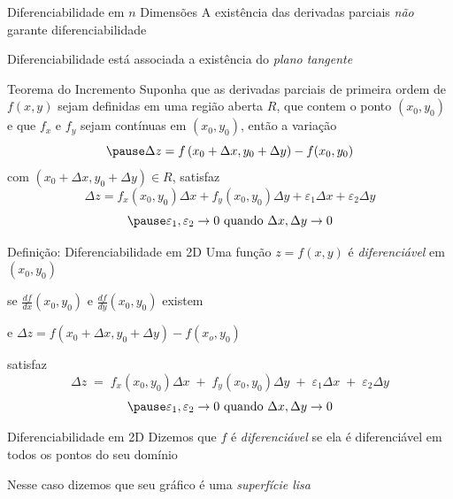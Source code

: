 \begin{frame}{Diferenciabilidade em $n$ Dimensões}
	A existência das derivadas parciais \emph{não} garante diferenciabilidade

	\pause
	\vspace{\baselineskip}
	Diferenciabilidade está associada a existência do \emph{plano tangente}
\end{frame}

\begin{frame}{Teorema do Incremento}
	Suponha que as derivadas parciais de primeira ordem de $f(x, y)$ sejam
	definidas em uma região aberta $R$, que contem o ponto $(x_0, y_0)$
    \pause
	e que $f_x$ e $f_y$ sejam contínuas em $(x_0, y_0)$,
	\pause
	então a variação
	\[
		\pause
        \Delta z
		= f\left(x_0+\Delta x, y_0 + \Delta y\right)
		- f(x_0, y_0)
	\]
	\pause
    com \(\left(x_0+\Delta x, y_0 + \Delta y\right)\in R\),
	\pause
    satisfaz
	\[
		\Delta z
		= f_x(x_0, y_0) \Delta x
		+ f_y(x_0, y_0) \Delta y
		+ \varepsilon_1 \Delta x
		+ \varepsilon_2 \Delta y
	\]
	\[
		\pause
        \varepsilon_1, \varepsilon_2 \to 0 \text{ quando } \Delta x, \Delta y \to 0
	\]
\end{frame}

\begin{frame}{Definição: Diferenciabilidade em 2D}
	Uma função \(z=f(x, y)\) é \emph{diferenciável} em \((x_0, y_0)\)

    \pause
    \vspace{0.5\baselineskip}
    se \(\frac{df}{dx}(x_0, y_0)\) e \(\frac{df}{dy}(x_0, y_0)\) existem

    \pause
    \vspace{0.5\baselineskip}
    e \(\Delta z = f(x_0+\Delta x, y_0+\Delta y)-f(x_o, y_0)\)

    \pause
    \vspace{0.5\baselineskip}
    satisfaz
	\[
		\Delta z
		\;=\; f_x(x_0, y_0) \Delta x
		\;+\; f_y(x_0, y_0) \Delta y
		\;+\; \varepsilon_1 \Delta x
		\;+\; \varepsilon_2 \Delta y
	\]
	\[
		\pause
        \varepsilon_1, \varepsilon_2 \to 0 \text{ quando } \Delta x, \Delta y \to 0
	\]
\end{frame}

\begin{frame}{Diferenciabilidade em 2D}
	Dizemos que $f$ é \emph{diferenciável}
	se ela é diferenciável em todos os
	pontos do seu domínio

	\pause
    \vspace{0.5\baselineskip}
    Nesse caso dizemos que seu gráfico é uma \emph{superfície lisa}
\end{frame}


